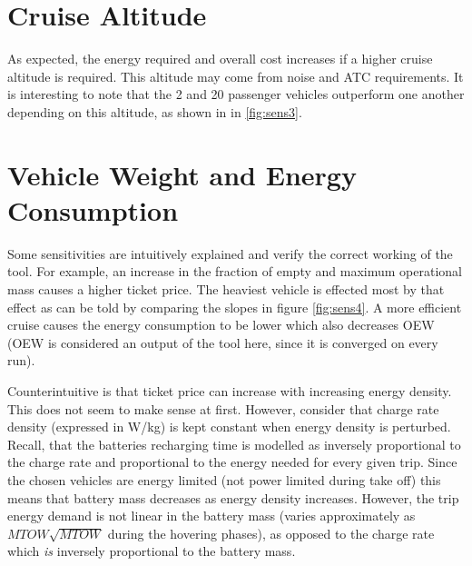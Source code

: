 \begin{figure}[H]
\begin{subfigure}[t]{0.33\textwidth}
    \captionsetup{justification=centering}
    \caption{}
    \label{fig:sens3}
\end{subfigure}
\captionsetup{justification=centering}
\caption{}
\label{fig:sens123}
\end{figure}


\section{Cruise Altitude}
As expected, the energy required and overall cost increases if a higher cruise altitude is required. This altitude may come from noise and ATC requirements. It is interesting to note that the 2 and 20 passenger vehicles outperform one another depending on this altitude, as shown in in \autoref{fig:sens3}.

\section{Vehicle Weight and Energy Consumption}
Some sensitivities are intuitively explained and verify the correct working of the tool. For example, an increase in the fraction of empty and maximum operational mass causes a higher ticket price. The heaviest vehicle is effected most by that effect as can be told by comparing the slopes in figure \ref{fig:sens4}. A more efficient cruise causes the energy consumption to be lower which also decreases OEW (OEW is considered an output of the tool here, since it is converged on every run). 

Counterintuitive is that ticket price can increase with increasing energy density. This does not seem to make sense at first. However, consider that charge rate density (expressed in W/kg) is kept constant when energy density is perturbed. Recall, that the batteries recharging time is modelled as inversely proportional to the charge rate and proportional to the energy needed for every given trip. Since the chosen vehicles are energy limited (not power limited during take off) this means that battery mass decreases as energy density increases. However, the trip energy demand is not linear in the battery mass (varies approximately as $MTOW\sqrt{MTOW}$ during the hovering phases), as opposed to the charge rate which \emph{is} inversely proportional to the battery mass.

